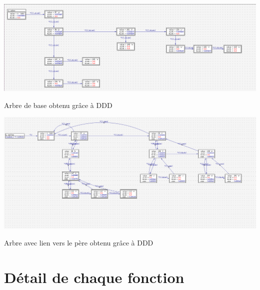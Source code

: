 \documentclass[a4paper]{article}
\begin{document}
\begin{center}
\includegraphics[scale=0.2]{image_arbre_base.png}

Arbre de base obtenu grâce à DDD
\end{center}

\begin{center}
\includegraphics[scale=0.2]{foret_newNode.png}

Arbre avec lien vers le père obtenu grâce à DDD
\end{center}

\section{Détail de chaque fonction}
\end{document}
